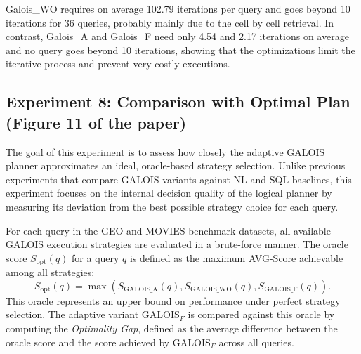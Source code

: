 \documentclass[11pt]{article}
\begin{document}
 Galois\_WO requires on average 102.79 iterations per query and goes beyond 10 iterations for 36 queries, probably mainly due to the cell by cell retrieval. In contrast, Galois\_A and Galois\_F need only 4.54 and 2.17 iterations on average and no query goes beyond 10 iterations, showing that the optimizations limit the iterative process and prevent very costly executions.

\subsection{Experiment 8: Comparison with Optimal Plan (Figure 11 of the paper)}

The goal of this experiment is to assess how closely the adaptive GALOIS planner approximates an ideal, oracle-based strategy selection. Unlike previous experiments that compare GALOIS variants against NL and SQL baselines, this experiment focuses on the internal decision quality of the logical planner by measuring its deviation from the best possible strategy choice for each query.

For each query in the GEO and MOVIES benchmark datasets, all available GALOIS execution strategies are evaluated in a brute-force manner. The oracle score \( S_{\text{opt}}(q) \) for a query \( q \) is defined as the maximum AVG-Score achievable among all strategies:
\[
S_{\text{opt}}(q) = \max \left( S_{\text{GALOIS\_A}}(q), S_{\text{GALOIS\_WO}}(q), S_{\text{GALOIS\_F}}(q) \right).
\]
This oracle represents an upper bound on performance under perfect strategy selection. The adaptive variant GALOIS\(_F\) is compared against this oracle by computing the \emph{Optimality Gap}, defined as the average difference between the oracle score and the score achieved by GALOIS\(_F\) across all queries.
\end{document}
